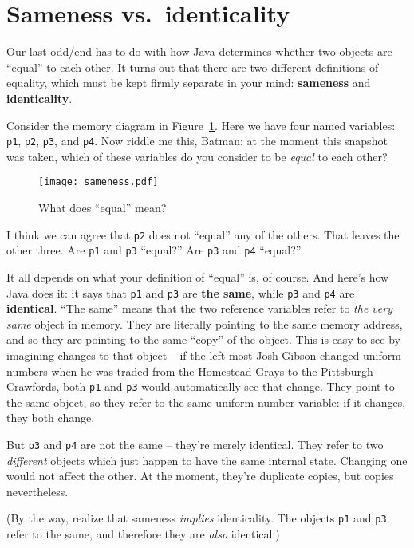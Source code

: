 \section{Sameness vs.~identicality}

Our last odd/end has to do with how Java determines whether two objects are
``equal'' to each other. It turns out that there are two different definitions
of equality, which must be kept firmly separate in your mind:
\textbf{sameness} and \textbf{identicality}.

Consider the memory diagram in Figure~\ref{fig:sameness}. Here we have four
named variables: \texttt{p1}, \texttt{p2}, \texttt{p3}, and \texttt{p4}. Now
riddle me this, Batman: at the moment this snapshot was taken, which of these
variables do you consider to be \textit{equal} to each other?

\begin{figure}[ht]
\centering
\texttt{[image: sameness.pdf]}
\caption{What does ``equal'' mean?}
\label{fig:sameness}
\end{figure}

I think we can agree that \texttt{p2} does not ``equal'' any of the others.
That leaves the other three. Are \texttt{p1} and \texttt{p3} ``equal?'' Are
\texttt{p3} and \texttt{p4} ``equal?''

It all depends on what your definition of ``equal'' is, of course. And here's
how Java does it: it says that \texttt{p1} and \texttt{p3} are \textbf{the
same}, while \texttt{p3} and \texttt{p4} are \textbf{identical}. ``The same''
means that the two reference variables refer to \textit{the very same} object
in memory. They are literally pointing to the same memory address, and so they
are pointing to the same ``copy'' of the object. This is easy to see by
imagining changes to that object -- if the left-most Josh Gibson changed
uniform numbers when he was traded from the Homestead Grays to the Pittsburgh
Crawfords, both \texttt{p1} and \texttt{p3} would automatically see that
change. They point to the same object, so they refer to the same uniform
number variable: if it changes, they both change.

But \texttt{p3} and \texttt{p4} are not the same -- they're merely identical.
They refer to two \textit{different} objects which just happen to have the
same internal state. Changing one would not affect the other. At the moment,
they're duplicate copies, but copies nevertheless.

(By the way, realize that sameness \textit{implies} identicality. The objects
\texttt{p1} and \texttt{p3} refer to the same, and therefore they are
\textit{also} identical.)

